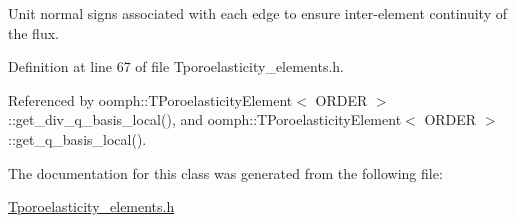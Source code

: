 Unit normal signs associated with each edge to ensure inter-\/element continuity of the flux. 



Definition at line 67 of file Tporoelasticity\+\_\+elements.\+h.



Referenced by oomph\+::\+T\+Poroelasticity\+Element$<$ O\+R\+D\+E\+R $>$\+::get\+\_\+div\+\_\+q\+\_\+basis\+\_\+local(), and oomph\+::\+T\+Poroelasticity\+Element$<$ O\+R\+D\+E\+R $>$\+::get\+\_\+q\+\_\+basis\+\_\+local().



The documentation for this class was generated from the following file\+:\begin{DoxyCompactItemize}
\item 
\hyperlink{Tporoelasticity__elements_8h}{Tporoelasticity\+\_\+elements.\+h}\end{DoxyCompactItemize}
